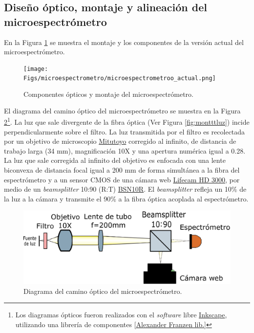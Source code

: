 
\singlespacing
\subsection{Diseño óptico, montaje y alineación del microespectrómetro}
\label{sec:montalin}

\hspace{0.5cm}En la Figura \ref{fig:micromfinal} se muestra el montaje y los componentes de la versión actual del microespectrómetro. 
\begin{figure}[H]
	\centering
	\texttt{[image: Figs/microespectrometro/microespectrometroo\_actual.png]}
	\caption{Componentes ópticos y montaje del microespectrómetro.}
	\label{fig:micromfinal}
\end{figure}
El diagrama del camino óptico del microespectrómetro se muestra en la Figura \ref{fig:diagcaminoopt}\footnote{Los diagramas ópticos fueron realizados con el \textit{software} libre \href{https://inkscape.org/es/}{Inkscape}, utilizando una librería de componentes [\href{http://www.gwoptics.org/ComponentLibrary/}{Alexander Franzen lib.]}}. La luz que sale divergente de la fibra óptica (Ver Figura \ref{fig:montttluz}) incide perpendicularmente sobre el filtro. La luz transmitida por el filtro es recolectada por un objetivo de microscopio \href{https://www.edmundoptics.com/p/10x-mitutoyo-plan-apo-infinity-corrected-long-wd-objective/6623/}{Mitutoyo} corregido al infinito, de distancia de trabajo larga (34 mm), magnificación 10X y una apertura numérica igual a 0.28. La luz que sale corregida al infinito del objetivo es enfocada con una lente biconvexa de distancia focal igual a 200 mm de forma simultánea a la fibra del espectrómetro y a un sensor CMOS de una cámara web \href{https://www.microsoft.com/accessories/es-xl/d/lifecam-hd-3000}{Lifecam HD 3000}, por medio de un \textit{beamsplitter} 10:90 (R:T) \href{https://www.thorlabs.com/thorproduct.cfm?partnumber=BSN10R}{BSN10R}. El \textit{beamsplitter} refleja un 10\% de la luz a la cámara y transmite el 90\% a la fibra óptica acoplada al espectrómetro. 
\begin{figure}[H]
	\centering
	\includegraphics[width=1.0\textwidth]{Figs/microespectrometro/diagopticosetup.png}
	\caption{Diagrama del camino óptico del microespectrómetro.}
	\label{fig:diagcaminoopt}
\end{figure}

